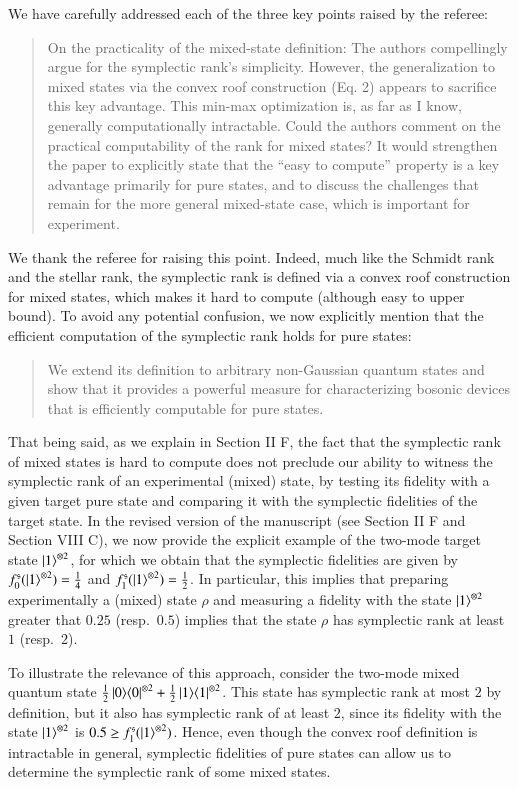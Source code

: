 \documentclass[a4paper,12pt]{article}
\newenvironment{Referee}[1]
{\noindent {\bf Comment #1:} \begin{quote} }
{\end{quote}\vspace{0 cm}}
\newenvironment{Response}
{\noindent \color{RawSienna}{\bf Response:} }
{\vspace{0.4 cm}}
\begin{document}
We have carefully addressed each of the three key points raised by the referee:


\begin{Referee}{1}
On the practicality of the mixed-state definition: The authors compellingly argue for the symplectic rank's simplicity. However, the generalization to mixed states via the convex roof construction (Eq. 2) appears to sacrifice this key advantage. This min-max optimization is, as far as I know, generally computationally intractable. Could the authors comment on the practical computability of the rank for mixed states? It would strengthen the paper to explicitly state that the ``easy to compute'' property is a key advantage primarily for pure states, and to discuss the challenges that remain for the more general mixed-state case, which is important for experiment.
\end{Referee}

\begin{Response}
We thank the referee for raising this point. Indeed, much like the Schmidt rank and the stellar rank, the symplectic rank is defined via a convex roof construction for mixed states, which makes it hard to compute (although easy to upper bound). 
To avoid any potential confusion, we now explicitly mention that the efficient computation of the symplectic rank holds for pure states:
\begin{quote}
    We extend its definition to arbitrary non-Gaussian quantum states and show that it provides a powerful measure for characterizing bosonic devices that is efficiently computable for pure states.
\end{quote}

That being said, as we explain in Section II F, the fact that the symplectic rank of mixed states is hard to compute does not preclude our ability to witness the symplectic rank of an experimental (mixed) state, by testing its fidelity with a given target pure state and comparing it with the symplectic fidelities of the target state. In the revised version of the manuscript (see Section II F and Section VIII C), we now provide the explicit example of the two-mode target state $\ket1^{\otimes2}$, for which we obtain that the symplectic fidelities are given by $f^{\mathfrak s}_0(\ket1^{\otimes2})=\frac14$ and $f^{\mathfrak s}_1(\ket1^{\otimes2})=\frac12$. In particular, this implies that preparing experimentally a (mixed) state $\rho$ and measuring a fidelity with the state $\ket1^{\otimes2}$ greater that $0.25$ (resp.\ $0.5$) implies that the state $\rho$ has symplectic rank at least $1$ (resp.\ $2$).

To illustrate the relevance of this approach, consider the two-mode mixed quantum state $\frac12\ket0\!\bra0^{\otimes2}+\frac12\ket1\!\bra1^{\otimes2}$. This state has symplectic rank at most $2$ by definition, but it also has symplectic rank of at least $2$, since its fidelity with the state $\ket1^{\otimes2}$ is $0.5\ge f^{\mathfrak s}_1(\ket1^{\otimes2})$. Hence, even though the convex roof definition is intractable in general, symplectic fidelities of pure states can allow us to determine the symplectic rank of some mixed states.
\end{Response}
\end{document}
